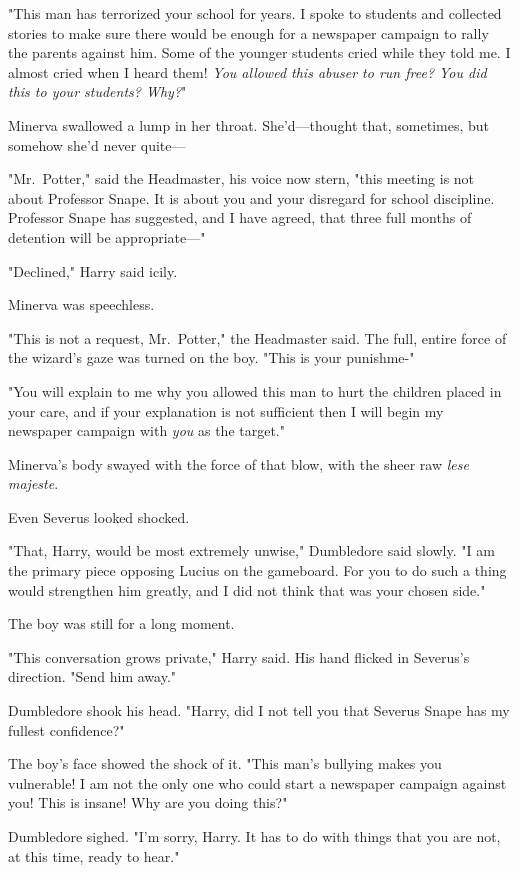 "This man has terrorized your school for years. I spoke to students and 
collected stories to make sure there would be enough for a newspaper campaign 
to rally the parents against him. Some of the younger students cried while they 
told me. I almost cried when I heard them! \emph{You allowed this abuser to run 
free? You did this to your students? Why?}"

Minerva swallowed a lump in her throat. She'd---thought that, sometimes, but 
somehow she'd never quite---

"Mr.~Potter," said the Headmaster, his voice now stern, "this meeting is not 
about Professor Snape. It is about you and your disregard for school 
discipline. Professor Snape has suggested, and I have agreed, that three full 
months of detention will be appropriate---"

"Declined," Harry said icily.

Minerva was speechless.

"This is not a request, Mr.~Potter," the Headmaster said. The full, entire 
force of the wizard's gaze was turned on the boy. "This is your punishme-"

"You will explain to me why you allowed this man to hurt the children placed in 
your care, and if your explanation is not sufficient then I will begin my 
newspaper campaign with \emph{you} as the target."

Minerva's body swayed with the force of that blow, with the sheer raw 
\emph{lese majeste}.

Even Severus looked shocked.

"That, Harry, would be most extremely unwise," Dumbledore said slowly. "I am 
the primary piece opposing Lucius on the gameboard. For you to do such a thing 
would strengthen him greatly, and I did not think that was your chosen side."

The boy was still for a long moment.

"This conversation grows private," Harry said. His hand flicked in Severus's 
direction. "Send him away."

Dumbledore shook his head. "Harry, did I not tell you that Severus Snape has my 
fullest confidence?"

The boy's face showed the shock of it. "This man's bullying makes you 
vulnerable! I am not the only one who could start a newspaper campaign against 
you! This is insane! Why are you doing this?"

Dumbledore sighed. "I'm sorry, Harry. It has to do with things that you are 
not, at this time, ready to hear."

